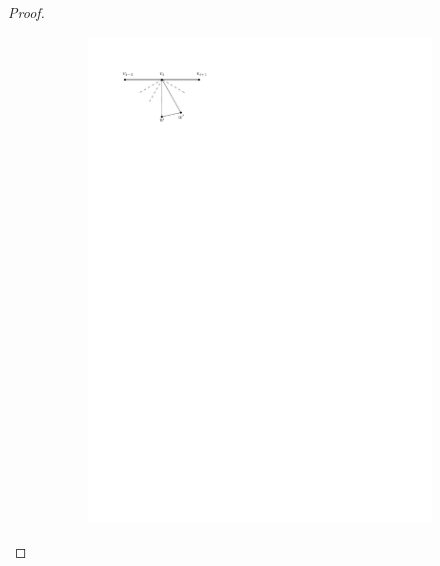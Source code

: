 \begin{proof}
\begin{figure}[h]
    \centering
    \begin{subfigure}[b]{0.5\linewidth}
        \includegraphics[width=\linewidth]{redAlgo/img/walkProofA}
        \caption{}
    \end{subfigure}%
    \begin{subfigure}[b]{0.5\linewidth}

\end{subfigure}
\end{figure}
\end{proof}
